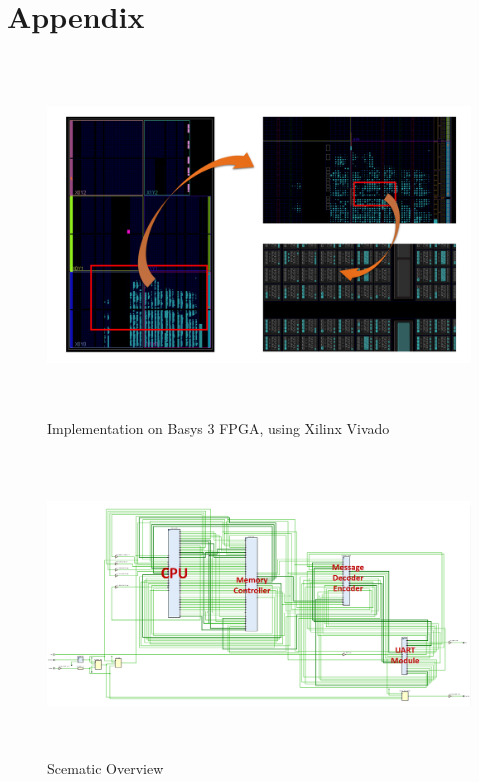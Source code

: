 \documentclass[12pt, a4paper]{article}
\theoremstyle{margin}
\begin{document}
\section{Appendix}

\begin{figure}[H]
	\begin{center}
	  \includegraphics[height=9.5cm]{implementation-graph.png}
	\end{center}
	\caption{Implementation on Basys 3 FPGA, using Xilinx Vivado}
\end{figure}

\begin{figure}[H]
	\begin{center}
	  \includegraphics[height=8cm]{implementation-circuit-overview-captioned.png}
	\end{center}
	\caption{Scematic Overview}
\end{figure}
\end{document}
